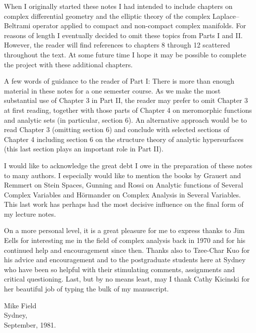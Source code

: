 When I originally started these notes I had intended to include chapters on complex differential geometry and the elliptic theory of the complex Laplace--Beltrami operator applied to compact and non-compact complex manifolds. For reasons of length I eventually decided to omit these topics from Parts I and II. However, the reader will find references to chapters 8 through 12 scattered throughout the text. At some future time I hope it may be possible to complete the project with these additional chapters.

A few words of guidance to the reader of Part I: There is more than enough material in these notes for a one semester course. As we make the most substantial use of Chapter 3 in Part II, the reader may prefer to omit Chapter 3 at first reading, together with those parts of Chapter 4 on meromorphic functions and analytic sets (in particular, section 6). An alternative approach would be to read Chapter 3 (omitting section 6) and conclude with selected sections of Chapter 4 including section 6 on the structure theory of analytic hypersurfaces (this last section plays an important role in Part II).

I would like to acknowledge the great debt I owe in the preparation of these notes to many authors. I especially would like to mention the books by Grauert and Remmert on Stein Spaces, Gunning and Rossi on Analytic functions of Several Complex Variables and H\"ormander on Complex Analysis in Several Variables. This last work has perhaps had the most decisive influence on the final form of my lecture notes.

On a more personal level, it is a great pleasure for me to express thanks to Jim Eells for interesting me in the field of complex analysis back in 1970 and for his continued help and encouragement since then. Thanks also to Tzee-Char Kuo for his advice and encouragement and to the postgraduate students here at Sydney who have been so helpful with their stimulating comments, assignments and critical questioning. Last, but by no means least, may I thank Cathy Kicinski for her beautiful job of typing the bulk of my manuscript.

\begin{flushright}Mike Field\\Sydney,\\September, 1981.\end{flushright}

